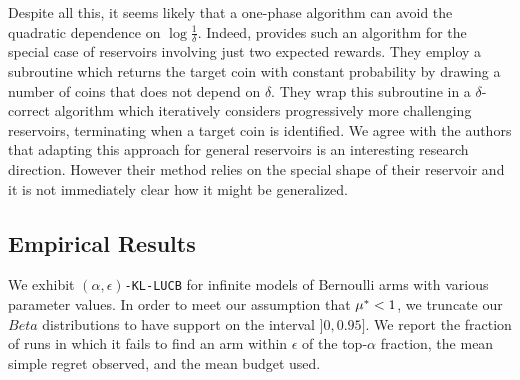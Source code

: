 Despite all this, it seems likely that a one-phase algorithm can avoid the
quadratic dependence on $\log \frac{1}{\delta}$.
Indeed, \cite{jamieson2016power}
provides such an algorithm for the special case of reservoirs involving just
two expected rewards.
They employ a subroutine which 
returns the target coin with constant probability
by drawing a number of coins that does not depend on $\delta$.
They wrap this subroutine in a $\delta$-correct algorithm which iteratively
considers progressively more challenging reservoirs,
terminating when
a target coin is identified.
We agree with the authors that adapting this approach for general reservoirs is
an interesting research direction.
However their method relies on the special
shape of their reservoir
and it is not immediately clear how it might be generalized.


%

%

\subsection{Empirical Results}\label{sec-empirical}

We exhibit
\texttt{$(\alpha,\epsilon)$-KL-LUCB} for infinite models of Bernoulli arms with
various parameter values.
In order to meet our assumption that $\mu^* < 1$,
we truncate our $Beta$ distributions to have support on the
interval $]0, 0.95]$.
We report the fraction of runs in which it fails to find an arm within $\epsilon$ of the top-$\alpha$
fraction, the mean simple regret observed, and the mean budget used.

